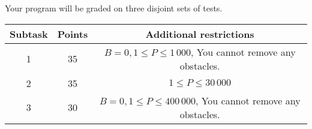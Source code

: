 Your program will be graded on three disjoint sets of tests. 

\begin{center}
\renewcommand{\arraystretch}{1.3}
\begin{tabular}{|c|c|c|}
\hline
\textbf{Subtask} & 
\textbf{Points} & 
\textbf{Additional restrictions}
\\ \hline
1 & 35 & $B = 0, 1 \le P \le 1\,000$, You cannot remove any obstacles. \\ \hline
2 & 35 & $1 \le P \le 30\,000$ \\ \hline
3 & 30 & $B = 0, 1 \le P \le 400\,000$, You cannot remove any obstacles. \\ \hline
\end{tabular}
\end{center}